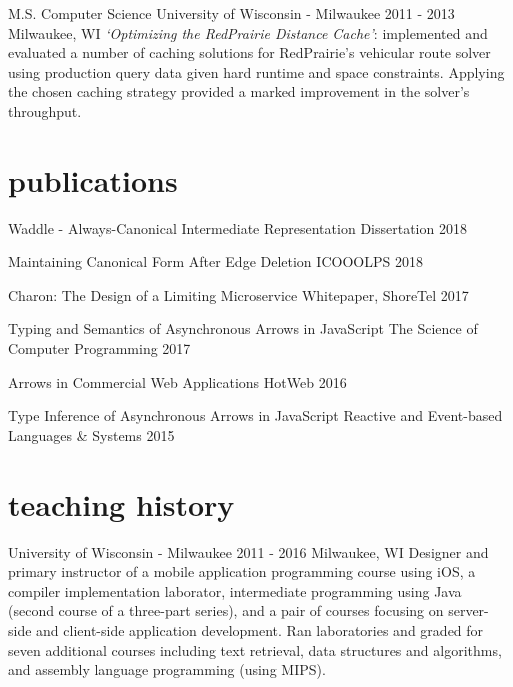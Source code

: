 \documentclass[]{clean-resume}
\begin{document}
\entry
  {M.S. Computer Science}
  {University of Wisconsin - Milwaukee}
  {2011 - 2013}
  {Milwaukee, WI}
  {
    \emph{`Optimizing the RedPrairie Distance Cache'}: implemented and evaluated a number of caching solutions for RedPrairie's vehicular route solver using production query data given hard runtime and space constraints. Applying the chosen caching strategy provided a marked improvement in the solver's throughput.
  }

\section{publications}

\shortentry
  {Waddle - Always-Canonical Intermediate Representation}
  {Dissertation}
  {2018}
  
\shortentry
  {Maintaining Canonical Form After Edge Deletion}
  {ICOOOLPS}
  {2018}

\shortentry
  {Charon: The Design of a Limiting Microservice}
  {Whitepaper, ShoreTel}
  {2017}

\shortentry
  {Typing and Semantics of Asynchronous Arrows in JavaScript}
  {The Science of Computer Programming}
  {2017}
  
\shortentry
  {Arrows in Commercial Web Applications}
  {HotWeb}
  {2016}
  
\shortentry
  {Type Inference of Asynchronous Arrows in JavaScript}
  {Reactive and Event-based Languages \& Systems}
  {2015}

\section{teaching history}

\entry
  {University of Wisconsin - Milwaukee}
  {}
  {2011 - 2016}
  {Milwaukee, WI}
  {
    Designer and primary instructor of a mobile application programming course using iOS, a compiler implementation laborator, intermediate programming using Java (second course of a three-part series), and a pair of courses focusing on server-side and client-side application development. Ran laboratories and graded for seven additional courses including text retrieval, data structures and algorithms, and assembly language programming (using MIPS).
  }
\end{document}
